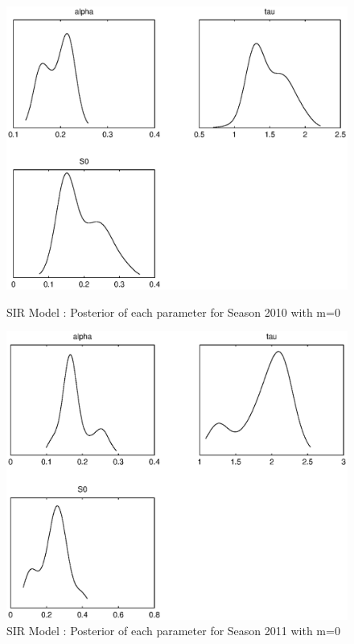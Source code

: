 \documentclass[11pt, a4paper]{article}
\begin{document}
\begin{figure}[H!]
\FloatBarrier
\centering
    \includegraphics[height = 0.25\textheight]{figures/SIR_posterior_season1_m=0.eps}
    \caption{SIR Model : Posterior of each parameter for Season 2010 with m=0}
    \label{fig:sir0_post1}
    \includegraphics[height = 0.25\textheight]{figures/SIR_posterior_season2_m=0.eps}
    \caption{SIR Model : Posterior of each parameter for Season 2011 with m=0}
    \label{fig:sir0_post2}

\end{figure}
\end{document}
